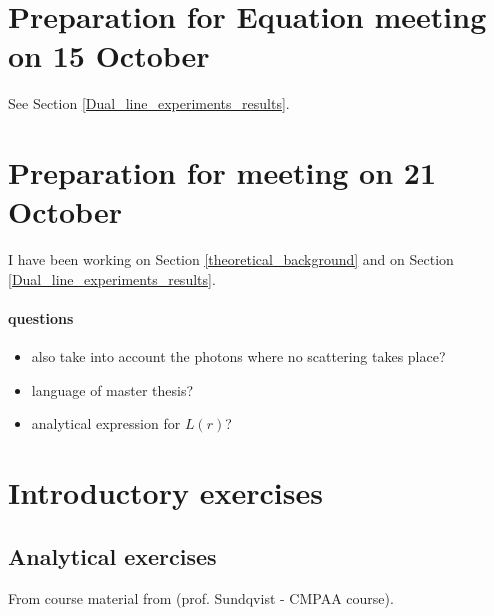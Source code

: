 \documentclass[../main/main.tex]{subfiles}
\begin{document}
\section{Preparation for Equation meeting on 15 October}
See Section \underline{\ref{Dual_line_experiments_results}}.

\section{Preparation for meeting on 21 October}
I have been working on Section \underline{\ref{theoretical_background}} and on Section \underline{\ref{Dual_line_experiments_results}}.

\paragraph{questions}
\begin{itemize}
\item also take into account the photons where no scattering takes place?
\item language of master thesis?
\item analytical expression for $L(r)$?
\end{itemize}


\newpage
\section{Introductory exercises}

\subsection{Analytical exercises}
From course material from (prof. Sundqvist - CMPAA course).
\end{document}
